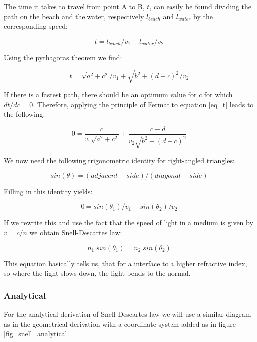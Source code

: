 \documentclass{article}
\begin{document}
The time it takes to travel from point A to B, $t$, can easily be found dividing the path on the beach and the water, respectively $l_{beach}$ and $l_{water}$ by the corresponding speed:

\begin{equation*}
	t = l_{beach}/v_1 + l_{water}/v_2
\end{equation*}

Using the pythagoras theorem we find:

\begin{equation}
	t = \sqrt{a^2 + c^2}/v_1 + \sqrt{b^2 + (d-c)^2}/v_2
	\label{eq_t}
\end{equation}

If there is a fastest path, there should be an optimum value for $c$ for which $dt/dc = 0$. Therefore, applying the principle of Fermat to equation \ref{eq_t} leads to the following:

\begin{equation*}
	0 = \frac{c}{v_1 \sqrt{a^2 + c^2}} + \frac{c-d}{v_2 \sqrt{b^2 + (d-c)^2}}
\end{equation*}

We now need the following trigonometric identity for right-angled triangles:
 
\begin{equation}
	sin(\theta) = (adjacent-side)/(diagonal-side) 
	\label{eq_sin_identity}
\end{equation}

Filling in this identity yields:

\begin{equation*}
	0 =  sin(\theta _1)/v_1 - sin(\theta _2)/v_2
\end{equation*}

If we rewrite this and use the fact that the speed of light in a medium is given by $v = c/n$ we obtain Snell-Descartes law:

\begin{equation*}
	n_1 \; sin(\theta _1) = n_2 \; sin(\theta _2)
\end{equation*}

This equation basically tells us, that for a interface to a higher refractive index, so where the light slows down, the light bends to the normal.

\subsubsection{Analytical}

For the analytical derivation of Snell-Descartes law we will use a similar diagram as in the geometrical derivation with a coordinate system added as in figure \ref{fig_snell_analytical}.
\end{document}
